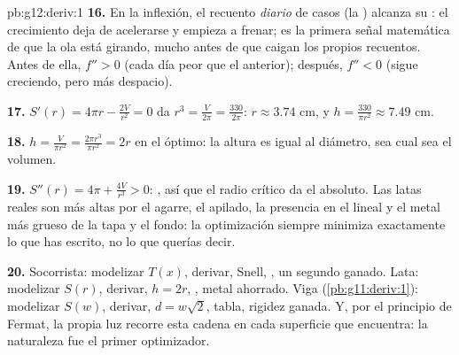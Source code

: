 \begin{solution}{pb:g12:deriv:1}
\textbf{16.} En la inflexión, el recuento \emph{diario} de casos (la
) alcanza su : el crecimiento deja de acelerarse y empieza a
frenar; es la primera señal matemática de que la ola está girando, mucho
antes de que caigan los propios recuentos. Antes de ella, $f'' > 0$ (cada
día peor que el anterior); después, $f'' < 0$ (sigue creciendo, pero más
despacio).

\textbf{17.} $S'(r) = 4\pi r - \frac{2V}{r^2} = 0$ da
$r^3 = \frac{V}{2\pi} = \frac{330}{2\pi}$: $r \approx 3.74$ cm, y
$h = \frac{330}{\pi r^2} \approx 7.49$ cm.

\textbf{18.} $h = \frac{V}{\pi r^2} = \frac{2\pi r^3}{\pi r^2} = 2r$ en el
óptimo: la altura es igual al diámetro, sea cual sea el volumen.

\textbf{19.} $S''(r) = 4\pi + \frac{4V}{r^3} > 0$: , así que el
radio crítico da el  absoluto. Las latas reales son más altas por el
agarre, el apilado, la presencia en el lineal y el metal más grueso de la
tapa y el fondo: la optimización siempre minimiza exactamente lo que has
escrito, no lo que querías decir.

\textbf{20.} Socorrista: modelizar $T(x)$, derivar, Snell, , un
segundo ganado. Lata: modelizar $S(r)$, derivar, $h = 2r$, ,
metal ahorrado. Viga (\cref{pb:g11:deriv:1}): modelizar $S(w)$, derivar,
$d = w\sqrt2$, tabla, rigidez ganada. Y, por el principio de Fermat, la
propia luz recorre esta cadena en cada superficie que encuentra: la
naturaleza fue el primer optimizador.
\end{solution}

